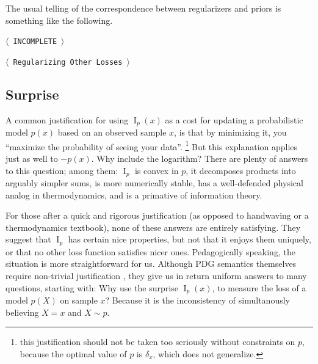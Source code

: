 \documentclass[twoside]{article}
\newif\ifappendix
\theoremstyle{plain}
\theoremstyle{definition}
\DeclareMathOperator{\I}{\mathrm{I}} %
\newcommand{\TODO}[1][INCOMPLETE]{{\centering\Large\color{red}$\langle$~\texttt{#1}~$\rangle$\par}}
\begin{document}
The usual telling of the correspondence between regularizers and priors is something like the following.

\TODO

\TODO[Regularizing Other Losses]

\subsection{Surprise}
A common justification for using $\I_p(x)$ as a cost for updating a probabilistic model $p(x)$ based on an observed sample $x$, is that by minimizing it, you  ``maximize the probability of seeing your data''.%
%
 	\footnote{this justification should not be taken too seriously  without constraints on $p$, because the optimal value of $p$  is $\delta_x$, which does not generalize.}
But this explanation applies just as well to $-p(x)$. Why include the logarithm?
There are plenty of answers to this question; among them: $\I_p$ is convex in $p$, it decomposes products into arguably simpler sums, is more numerically stable, has a well-defended physical analog in thermodynamics, and is a primative of information theory.

For those after a quick and rigorous justification (as opposed to handwaving or a thermodynamics textbook), none of these answers are entirely satisfying.
They suggest that $\I_p$ has certain nice properties, but not that it enjoys them uniquely, or that no other loss function satisfies nicer ones.
Pedagogically speaking, the situation is more straightforward for us.
Although PDG semantics themselves require non-trivial justification%
, they give us in return uniform answers to many questions, starting with:
Why use the surprise $\I_p(x)$, to measure the loss of a model $p(X)$ on sample $x$? Because it is the inconsistency of simultanously believing $X = x$ and $X \sim p$.


\fi%
\end{document}
